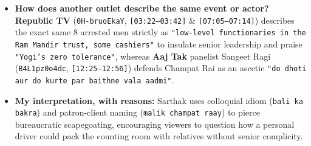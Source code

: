 \documentclass[10pt,a4paper]{article}
\begin{document}
\begin{itemize}[leftmargin=1.5em, itemsep=3pt, topsep=4pt]
  \item \textbf{How does another outlet describe the same event or actor?} \textbf{Republic TV} (\texttt{0H-bruoEkaY}, \texttt{[03:22--03:42]} \& \texttt{[07:05--07:14]}) describes the exact same 8 arrested men strictly as \texttt{"low-level functionaries in the Ram Mandir trust, some cashiers"} to insulate senior leadership and praise \texttt{"Yogi's zero tolerance"}, whereas \textbf{Aaj Tak} panelist Sangeet Ragi (\texttt{B4L1pz0o4dc}, \texttt{[12:25--12:56]}) defends Champat Rai as an ascetic \texttt{"do dhoti aur do kurte par baithne vala aadmi"}.
  \item \textbf{My interpretation, with reasons:} Sarthak uses colloquial idiom (\texttt{bali ka bakra}) and patron-client naming (\texttt{malik champat raay}) to pierce bureaucratic scapegoating, encouraging viewers to question how a personal driver could pack the counting room with relatives without senior complicity.
\end{itemize}
\end{document}
